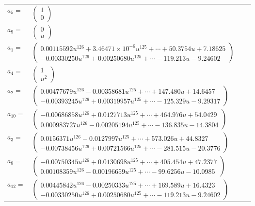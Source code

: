 \documentclass[1p]{elsarticle_modified}
\theoremstyle{definition}
\begin{document}
\begin{tabular}{m{7pt} m{180pt} m{7pt} m{180pt} }
\flushright $a_{5}=$&$\begin{pmatrix}1\\0\end{pmatrix}$ \\
\flushright $a_{9}=$&$\begin{pmatrix}0\\u\end{pmatrix}$ \\
\flushright $a_{1}=$&$\begin{pmatrix}0.00115592 u^{126}+3.46471\times10^{-6} u^{125}+\cdots+50.3754 u+7.18625\\-0.00330250 u^{126}+0.00250680 u^{125}+\cdots-119.213 u-9.24602\end{pmatrix}$ \\
\flushright $a_{4}=$&$\begin{pmatrix}1\\u^2\end{pmatrix}$ \\
\flushright $a_{2}=$&$\begin{pmatrix}0.00477679 u^{126}-0.00358681 u^{125}+\cdots+147.480 u+14.6457\\-0.00393245 u^{126}+0.00319957 u^{125}+\cdots-125.329 u-9.29317\end{pmatrix}$ \\
\flushright $a_{10}=$&$\begin{pmatrix}-0.00686858 u^{126}+0.0127713 u^{125}+\cdots+464.976 u+54.0429\\0.000983727 u^{126}-0.00205194 u^{125}+\cdots-136.835 u-14.3804\end{pmatrix}$ \\
\flushright $a_{3}=$&$\begin{pmatrix}0.0156371 u^{126}-0.0127997 u^{125}+\cdots+573.026 u+44.8327\\-0.00738456 u^{126}+0.00721566 u^{125}+\cdots-281.515 u-20.3776\end{pmatrix}$ \\
\flushright $a_{8}=$&$\begin{pmatrix}-0.00750345 u^{126}+0.0130698 u^{125}+\cdots+405.454 u+47.2377\\0.00108359 u^{126}-0.00196659 u^{125}+\cdots-99.6256 u-10.0985\end{pmatrix}$ \\
\flushright $a_{12}=$&$\begin{pmatrix}0.00445842 u^{126}-0.00250333 u^{125}+\cdots+169.589 u+16.4323\\-0.00330250 u^{126}+0.00250680 u^{125}+\cdots-119.213 u-9.24602\end{pmatrix}$ \\

\end{tabular}
\end{document}
